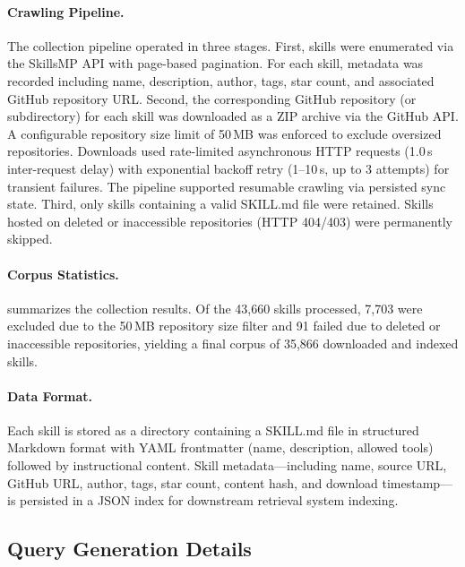 \documentclass[11pt]{article}
\begin{document}
\paragraph{Crawling Pipeline.}
The collection pipeline operated in three stages.
First, skills were enumerated via the SkillsMP API with page-based pagination. For each skill, metadata was recorded including name, description, author, tags, star count, and associated GitHub repository URL.
Second, the corresponding GitHub repository (or subdirectory) for each skill was downloaded as a ZIP archive via the GitHub API.
A configurable repository size limit of 50\,MB was enforced to exclude oversized repositories.
Downloads used rate-limited asynchronous HTTP requests (1.0\,s inter-request delay) with exponential backoff retry (1--10\,s, up to 3 attempts) for transient failures.
The pipeline supported resumable crawling via persisted sync state.
Third, only skills containing a valid SKILL.md file were retained. Skills hosted on deleted or inaccessible repositories (HTTP 404/403) were permanently skipped.

\paragraph{Corpus Statistics.}
 summarizes the collection results.
Of the 43,660 skills processed, 7,703 were excluded due to the 50\,MB repository size filter and 91 failed due to deleted or inaccessible repositories, yielding a final corpus of 35,866 downloaded and indexed skills.

\begin{table}[t]
  \centering
  \caption{Skill corpus collection statistics.}
  \label{tab:corpus_stats}
  
\end{table}

\paragraph{Data Format.}
Each skill is stored as a directory containing a SKILL.md file in structured Markdown format with YAML frontmatter (name, description, allowed tools) followed by instructional content.
Skill metadata---including name, source URL, GitHub URL, author, tags, star count, content hash, and download timestamp---is persisted in a JSON index for downstream retrieval system indexing.

\subsection{Query Generation Details}
\label{sec:query_generation_details}
\end{document}
